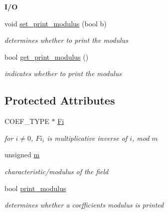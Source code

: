 \begin{Indent}\textbf{ I/O}\par
\begin{DoxyCompactItemize}
\item 
\mbox{\label{class_prime___field_a1ff3ec98ffb33a35c51eb3ce99ae7ebd}} 
void \hyperlink{class_prime___field_a1ff3ec98ffb33a35c51eb3ce99ae7ebd}{set\+\_\+print\+\_\+modulus} (bool b)
\begin{DoxyCompactList}\small\item\em determines whether to print the modulus \end{DoxyCompactList}\item 
\mbox{\label{class_prime___field_a4814e8ada9b0f2248eb65af7d6346244}} 
bool \hyperlink{class_prime___field_a4814e8ada9b0f2248eb65af7d6346244}{get\+\_\+print\+\_\+modulus} ()
\begin{DoxyCompactList}\small\item\em indicates whether to print the modulus \end{DoxyCompactList}\end{DoxyCompactItemize}
\end{Indent}
\subsection*{Protected Attributes}
\begin{DoxyCompactItemize}
\item 
\mbox{\label{class_prime___field_ac89c28052f4f4a90263c810f85c81d37}} 
C\+O\+E\+F\+\_\+\+T\+Y\+PE $\ast$ \hyperlink{class_prime___field_ac89c28052f4f4a90263c810f85c81d37}{Fi}
\begin{DoxyCompactList}\small\item\em for $i\neq0$, $Fi_i$ is multiplicative inverse of $i$, mod $m$ \end{DoxyCompactList}\item 
\mbox{\label{class_prime___field_ac6691080cfb04353767aedffe24d661d}} 
unsigned \hyperlink{class_prime___field_ac6691080cfb04353767aedffe24d661d}{m}
\begin{DoxyCompactList}\small\item\em characteristic/modulus of the field \end{DoxyCompactList}\item 
\mbox{\label{class_prime___field_ab9ea57c2214d84d29908b445423bb57b}} 
bool \hyperlink{class_prime___field_ab9ea57c2214d84d29908b445423bb57b}{print\+\_\+modulus}
\begin{DoxyCompactList}\small\item\em determines whether a coefficient\textquotesingle{}s modulus is printed \end{DoxyCompactList}\end{DoxyCompactItemize}


